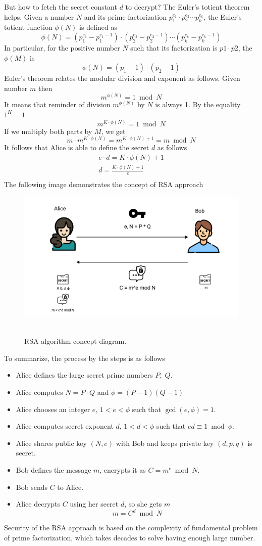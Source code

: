 But how to fetch the secret constant $d$ to decrypt?
The Euler's totient theorem helps.
Given a number $N$ and its prime factorization $p_1^{e_1}\cdot p_2^{e_2} \cdots p_k^{e_k}$, the Euler's totient function
$\phi(N)$ is defined as
\[
    \phi(N) = (p_1^{e_1} - p_1^{e_1 - 1}) \cdot (p_2^{e_2} - p_2^{e_2 - 1}) \cdots (p_k^{e_k} - p_k^{e_k - 1})
\]
In particular, for the positive number $N$ such that its factorization is $p1 \cdot p2$, the $\phi(M)$ is
\[
    \phi(N) = (p_1 -1) \cdot (p_2 - 1)
\]
Euler's theorem relates the modular division and exponent as follows.
Given number $m$ then
\[
    m^{\phi(N)} = 1 \bmod N
\]
It means that reminder of division $m^{\phi(N)}$ by $N$ is always 1.
By the equality $1^K = 1$
\[
    m^{K \cdot \phi(N)} = 1 \bmod N
\]
If we multiply both parts by $M$, we get
\[
    m \cdot m^{K \cdot \phi(N)} = m^{K \cdot \phi(N) + 1} = m \bmod N
\]
It follows that Alice is able to define the secret $d$ as follows
\begin{gather*}
    e \cdot d = K \cdot \phi(N) + 1\\
    d = \frac{K \cdot \phi(N) + 1}{e}\\
\end{gather*}
The following image demonstrates the concept of RSA approach
\begin{figure}[H]
    \centering
    \includegraphics[width=1\textwidth]{./img/RSA}
    ~\caption{RSA algorithm concept diagram.}\label{fig:figure8}
\end{figure}
To summarize, the process by the steps is as follows
\begin{itemize}
    \item Alice defines the large secret prime numbers $P, \; Q$.
    \item Alice computes $N = P \cdot Q$ and $\phi = (P-1)(Q-1)$
    \item Alice chooses an integer $e$, $1<e< \phi$ such that $\gcd(e, \phi) = 1$.
    \item Alice computes secret exponent $d$, $1<d< \phi$ such that $ed \equiv 1 \bmod \phi$.
    \item Alice shares public key $(N,e)$ with Bob and keeps private key $(d, p, q)$ is secret.
    \item Bob defines the message $m$, encrypts it as $C = m^{e} \bmod N$.
    \item Bob sends $C$ to Alice.
    \item Alice decrypts $C$ using her secret $d$, so she gets $m$
    \[
        m = C^d \bmod N
    \]
\end{itemize}
Security of the RSA approach is based on the complexity of fundamental problem of prime factorization,
which takes decades to solve having enough large number.
